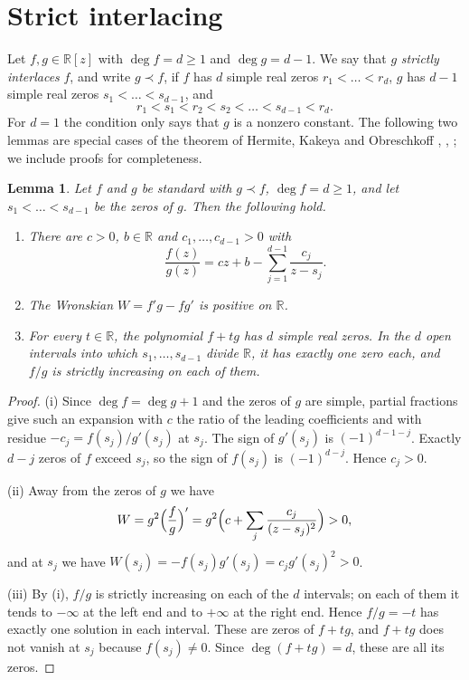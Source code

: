 \documentclass{amsart}
\newtheorem{lemma}[theorem]{Lemma}
\theoremstyle{remark}
\numberwithin{equation}{section}
\newcommand{\RR}{\mathbb{R}}
\begin{document}
\section{Strict interlacing}\label{sec:interlace}

Let $f,g\in\RR[z]$ with $\deg f=d\ge 1$ and $\deg g=d-1$. We say that $g$
\emph{strictly interlaces} $f$, and write $g\prec f$, if $f$ has $d$ simple
real zeros $r_1<\dots<r_d$, $g$ has $d-1$ simple real zeros
$s_1<\dots<s_{d-1}$, and
\[
r_1<s_1<r_2<s_2<\dots<s_{d-1}<r_d.
\]
For $d=1$ the condition only says that $g$ is a nonzero constant. The
following two lemmas are special cases of the theorem of Hermite, Kakeya
and Obreschkoff \cite{Obreschkoff}, \cite{Dedieu}, \cite[Theorem 2.4]{Branden}; we include
proofs for completeness.

\begin{lemma}\label{lem:pencil}
Let $f$ and $g$ be standard with $g\prec f$, $\deg f=d\ge 1$, and let
$s_1<\dots<s_{d-1}$ be the zeros of $g$. Then the following hold.
\begin{enumerate}
\item[(i)] There are $c>0$, $b\in\RR$ and $c_1,\dots,c_{d-1}>0$ with
\[
\frac{f(z)}{g(z)}=cz+b-\sum_{j=1}^{d-1}\frac{c_j}{z-s_j}.
\]
\item[(ii)] The Wronskian $W=f'g-fg'$ is positive on $\RR$.
\item[(iii)] For every $t\in\RR$, the polynomial $f+tg$ has $d$ simple real
zeros. In the $d$ open intervals into which $s_1,\dots,s_{d-1}$ divide
$\RR$, it has exactly one zero each, and $f/g$ is strictly increasing on each
of them.
\end{enumerate}
\end{lemma}

\begin{proof}
(i) Since $\deg f=\deg g+1$ and the zeros of $g$ are simple, partial
fractions give such an expansion with $c$ the ratio of the leading
coefficients and with residue $-c_j=f(s_j)/g'(s_j)$ at $s_j$. The sign of
$g'(s_j)$ is $(-1)^{d-1-j}$. Exactly $d-j$ zeros of $f$ exceed $s_j$, so the
sign of $f(s_j)$ is $(-1)^{d-j}$. Hence $c_j>0$.

(ii) Away from the zeros of $g$ we have
\[
W=g^2\Bigl(\frac fg\Bigr)'=g^2\Bigl(c+\sum_j\frac{c_j}{(z-s_j)^2}\Bigr)>0,
\]
and at $s_j$ we have $W(s_j)=-f(s_j)g'(s_j)=c_jg'(s_j)^2>0$.

(iii) By (i), $f/g$ is strictly increasing on each of the $d$ intervals; on
each of them it tends to $-\infty$ at the left end and to $+\infty$ at the
right end. Hence $f/g=-t$ has exactly one solution in each interval. These
are zeros of $f+tg$, and $f+tg$ does not vanish at $s_j$ because
$f(s_j)\ne 0$. Since $\deg(f+tg)=d$, these are all its zeros.
\end{proof}
\end{document}
